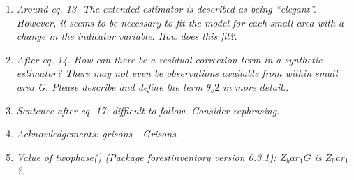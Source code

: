\documentclass{article}
\begin{document}
\begin{enumerate}

\item \textit{Around eq. 13. The extended estimator is described as being “elegant”. However, it seems to be necessary to fit the model for each small area with a change in the indicator variable. How does this fit?}.


\item \textit{After eq. 14. How can there be a residual correction term in a synthetic estimator? There may not even be observations available from within small area G. Please describe and define the term $\theta_s2$ in more detail.}.


\item \textit{Sentence after eq. 17: difficult to follow. Consider rephrasing.}.

\answerfin{}

\item \textit{Acknowledgements: grisons - Grisons}.


\item \textit{Value of twophase() (Package forestinventory version 0.3.1): $Z_bar_1G$ is $Z_bar_1$?}.

\answerfin{}

\end{enumerate}
  
\end{document}

